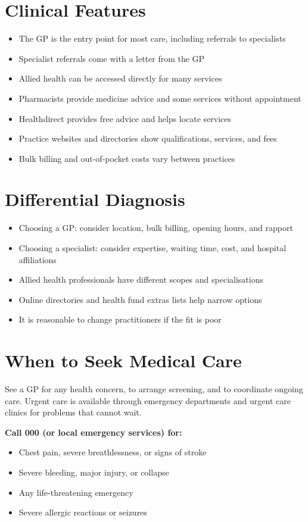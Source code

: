 \section*{Clinical Features}
\begin{itemize}
    \item The GP is the entry point for most care, including referrals to specialists
    \item Specialist referrals come with a letter from the GP
    \item Allied health can be accessed directly for many services
    \item Pharmacists provide medicine advice and some services without appointment
    \item Healthdirect provides free advice and helps locate services
    \item Practice websites and directories show qualifications, services, and fees
    \item Bulk billing and out-of-pocket costs vary between practices
\end{itemize}

\section*{Differential Diagnosis}
\begin{itemize}
    \item Choosing a GP: consider location, bulk billing, opening hours, and rapport
    \item Choosing a specialist: consider expertise, waiting time, cost, and hospital affiliations
    \item Allied health professionals have different scopes and specialisations
    \item Online directories and health fund extras lists help narrow options
    \item It is reasonable to change practitioners if the fit is poor
\end{itemize}

\section*{When to Seek Medical Care}
See a GP for any health concern, to arrange screening, and to coordinate ongoing care. Urgent care is available through emergency departments and urgent care clinics for problems that cannot wait.

\textbf{Call 000 (or local emergency services) for:}
\begin{itemize}
    \item Chest pain, severe breathlessness, or signs of stroke
    \item Severe bleeding, major injury, or collapse
    \item Any life-threatening emergency
    \item Severe allergic reactions or seizures
\end{itemize}

